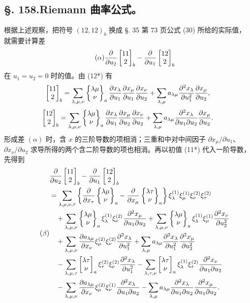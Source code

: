\subsection*{\S. 158.\quad Riemann 曲率公式。}

根据上述观察，把符号 \((12,12)_b\) 换成 \S. 35 第 73 页公式 (30) 所给的实际值，就需要计算差
\begin{equation}\tag{$\alpha$}
 \frac{\partial}{\partial u_2}\left[\begin{matrix}11\\2\end{matrix}\right]_{b}-
 \frac{\partial}{\partial u_1}\left[\begin{matrix}12\\2\end{matrix}\right]_{b}
\end{equation}
在 \(u_1=u_2=0\) 时的值。由 (12*) 有
\[
 \left[\begin{matrix}11\\2\end{matrix}\right]_{b}=\sum_{\lambda,\mu,\nu}\left\{\begin{matrix}\lambda\mu\\\nu\end{matrix}\right\}_{a}
 \frac{\partial x_\lambda}{\partial u_1}\frac{\partial x_\mu}{\partial u_1}\frac{\partial x_\nu}{\partial u_2}
 +\sum_{\lambda,\mu}a_{\lambda\mu}
 \frac{\partial^2x_\lambda}{\partial u_1^2}\frac{\partial x_\mu}{\partial u_2},
\]
\[
 \left[\begin{matrix}12\\2\end{matrix}\right]_{b}=\sum_{\lambda,\mu,\nu}\left\{\begin{matrix}\lambda\mu\\\nu\end{matrix}\right\}_{a}
 \frac{\partial x_\lambda}{\partial u_1}\frac{\partial x_\mu}{\partial u_2}\frac{\partial x_\nu}{\partial u_2}
 +\sum_{\lambda,\mu}a_{\lambda\mu}
 \frac{\partial^2x_\lambda}{\partial u_1\partial u_2}\frac{\partial x_\mu}{\partial u_2}.
\]
形成差 \((\alpha)\) 时，含 \(x\) 的三阶导数的项相消；三重和中对中间因子 \(\partial x_\mu/\partial u_1\)、\(\partial x_\nu/\partial u_2\) 求导所得的两个含二阶导数的项也相消。再以初值 (11*) 代入一阶导数，先得到
\begin{equation}\tag{$\beta$}
\begin{aligned}
&\frac{\partial}{\partial u_2}\left[\begin{matrix}11\\2\end{matrix}\right]_{b}-
 \frac{\partial}{\partial u_1}\left[\begin{matrix}12\\2\end{matrix}\right]_{b}  \\
&=\sum_{\lambda,\mu,\nu,\tau}\left\{
 \frac{\partial}{\partial x_\tau}\left\{\begin{matrix}\lambda\mu\\\nu\end{matrix}\right\}_{a}-
 \frac{\partial}{\partial x_\mu}\left\{\begin{matrix}\lambda\tau\\\nu\end{matrix}\right\}_{a}\right\}
 \xi_\lambda^{(1)}\xi_\mu^{(1)}\xi_\nu^{(2)}\xi_\tau^{(2)} \\
&\quad +\sum_{\lambda,\mu,\nu}\left\{\begin{matrix}\lambda\mu\\\nu\end{matrix}\right\}_{a}\xi_\lambda^{(1)}\xi_\nu^{(2)}\frac{\partial^2x_\mu}{\partial u_1\partial u_2}
 +\sum_{\lambda,\mu,\nu}\left\{\begin{matrix}\lambda\mu\\\nu\end{matrix}\right\}_{a}\xi_\lambda^{(1)}\xi_\mu^{(1)}\frac{\partial^2x_\nu}{\partial u_2^2} \\
&\quad +\sum_{\lambda,\mu,\nu}\frac{\partial a_{\lambda\mu}}{\partial x_\nu}\xi_\mu^{(2)}\xi_\nu^{(2)}\frac{\partial^2x_\lambda}{\partial u_1^2}
 +\sum_{\lambda,\mu}a_{\lambda\mu}\frac{\partial^2x_\lambda}{\partial u_1^2}\frac{\partial^2x_\mu}{\partial u_2^2} \\
&\quad -\sum_{\lambda,\mu,\tau}\left[\begin{matrix}\lambda\tau\\\nu\end{matrix}\right]_{a}\xi_\tau^{(2)}\xi_\nu^{(2)}\frac{\partial^2x_\lambda}{\partial u_1^2}
 -\sum_{\lambda,\tau,\nu}\left[\begin{matrix}\lambda\tau\\\nu\end{matrix}\right]_{a}\xi_\lambda^{(1)}\xi_\tau^{(2)}\frac{\partial^2x_\nu}{\partial u_1\partial u_2} \\
&\quad -\sum_{\lambda,\mu,\nu}\frac{\partial a_{\lambda\mu}}{\partial x_\nu}\xi_\mu^{(2)}\xi_\nu^{(1)}\frac{\partial^2x_\lambda}{\partial u_1\partial u_2}
 -\sum_{\lambda,\mu}a_{\lambda\mu}\frac{\partial^2x_\lambda}{\partial u_1\partial u_2}\frac{\partial^2x_\mu}{\partial u_1\partial u_2}.
\end{aligned}
\end{equation}
